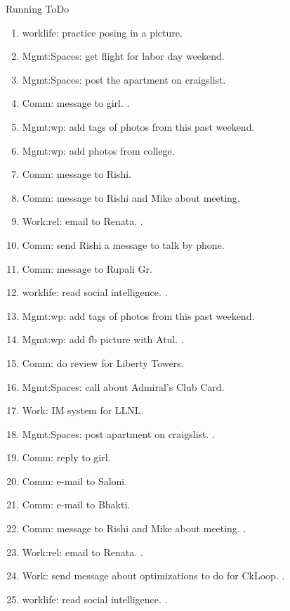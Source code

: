 \begin{columns}
\begin{column}{0.6\linewidth}
\begin{block}{Running ToDo}
\begin{enumerate}
        \item \tiny worklife: practice posing in a picture.  
        \item \tiny Mgmt:Spaces: get flight for labor day weekend. 
        \item \tiny Mgmt:Spaces: post the apartment on craigslist. 

        \item \tiny Comm: message to girl.  . 

        \item \tiny Mgmt:wp: add tags of photos from this past weekend. 
        \item \tiny Mgmt:wp: add photos from college. 
        \item \tiny Comm: message to Rishi.
        \item \tiny Comm: message to Rishi and Mike about meeting.
        \item \tiny Work:rel: email to Renata. . 
        
        \item \tiny Comm: send Rishi a message to talk by phone. 
        \item \tiny Comm: message to Rupali Gr.  
         
        \item \tiny worklife: read social intelligence. . 

        \item \tiny Mgmt:wp: add tags of photos from this past weekend.  
        \item \tiny Mgmt:wp: add fb picture with Atul. \dl{}. 
        \item \tiny Comm: do review for Liberty Towers.
        \item \tiny Mgmt:Spaces: call about Admiral's Club Card.
        \item \tiny Work: IM system for LLNL.
        \item \tiny Mgmt:Spaces: post apartment on craigslist. .

        \item \tiny Comm: reply to girl. 
        \item \tiny Comm: e-mail to Saloni.
        \item \tiny Comm: e-mail to Bhakti. 
        \item \tiny Comm: message to Rishi and Mike about
          meeting. . 
        \item \tiny Work:rel: email to Renata. . 
        \item \tiny Work: send message about optimizations to do for
          CkLoop.  . 
        \item \tiny worklife: read social intelligence. . 


\end{enumerate}
\end{block}
\end{column}
\end{columns}
